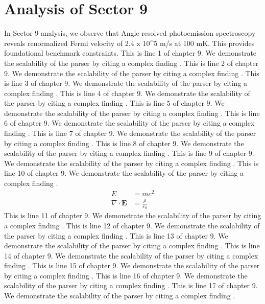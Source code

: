 \chapter{Analysis of Sector 9}

In Sector 9 analysis, we observe that Angle-resolved photoemission spectroscopy reveals renormalized Fermi velocity of 2.4 x 10^5 m/s at 100 mK. This provides foundational benchmark constraints.
This is line 1 of chapter 9. We demonstrate the scalability of the parser by citing a complex finding \cite{ref9_1}.
This is line 2 of chapter 9. We demonstrate the scalability of the parser by citing a complex finding \cite{ref9_2}.
This is line 3 of chapter 9. We demonstrate the scalability of the parser by citing a complex finding \cite{ref9_3}.
This is line 4 of chapter 9. We demonstrate the scalability of the parser by citing a complex finding \cite{ref9_4}.
This is line 5 of chapter 9. We demonstrate the scalability of the parser by citing a complex finding \cite{ref9_5}.
This is line 6 of chapter 9. We demonstrate the scalability of the parser by citing a complex finding \cite{ref9_6}.
This is line 7 of chapter 9. We demonstrate the scalability of the parser by citing a complex finding \cite{ref9_7}.
This is line 8 of chapter 9. We demonstrate the scalability of the parser by citing a complex finding \cite{ref9_8}.
This is line 9 of chapter 9. We demonstrate the scalability of the parser by citing a complex finding \cite{ref9_9}.
This is line 10 of chapter 9. We demonstrate the scalability of the parser by citing a complex finding \cite{ref9_10}.
\begin{align*}
  E &= mc^2 \\
  \nabla \cdot \mathbf{E} &= \frac{\rho}{\varepsilon_0}
\end{align*}
This is line 11 of chapter 9. We demonstrate the scalability of the parser by citing a complex finding \cite{ref9_11}.
This is line 12 of chapter 9. We demonstrate the scalability of the parser by citing a complex finding \cite{ref9_12}.
This is line 13 of chapter 9. We demonstrate the scalability of the parser by citing a complex finding \cite{ref9_13}.
This is line 14 of chapter 9. We demonstrate the scalability of the parser by citing a complex finding \cite{ref9_14}.
This is line 15 of chapter 9. We demonstrate the scalability of the parser by citing a complex finding \cite{ref9_15}.
This is line 16 of chapter 9. We demonstrate the scalability of the parser by citing a complex finding \cite{ref9_16}.
This is line 17 of chapter 9. We demonstrate the scalability of the parser by citing a complex finding \cite{ref9_17}.
